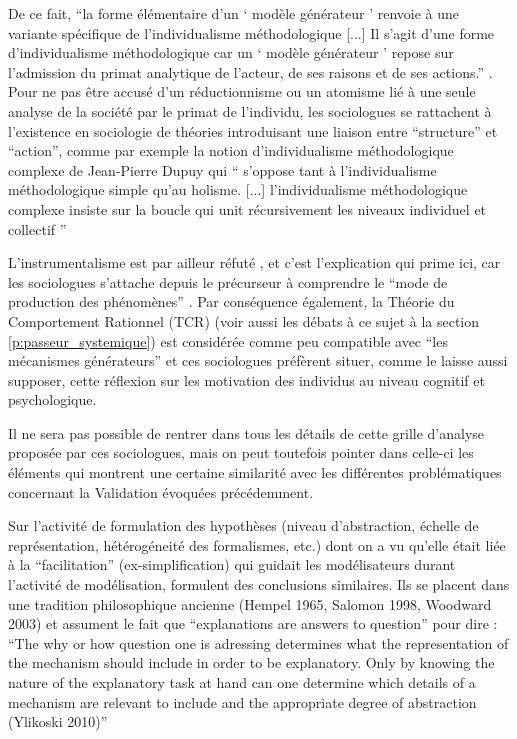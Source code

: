 De ce fait, \enquote{la forme élémentaire d’un \enquote{ modèle générateur } renvoie à une variante spécifique de l’individualisme méthodologique [...] Il s’agit d’une forme d’individualisme méthodologique car un  \enquote{ modèle générateur } repose sur l’admission du primat analytique de l’acteur, de ses raisons et de ses actions.} \autocite{Manzo2007}. Pour ne pas être accusé d'un réductionnisme ou un atomisme lié à une seule analyse de la société par le primat de l'individu, les sociologues se rattachent à l'existence en sociologie de théories introduisant une liaison entre \enquote{structure} et \enquote{action}, comme par exemple la notion d'individualisme méthodologique complexe de Jean-Pierre Dupuy \autocite{Dupuy2004} qui \enquote{ s’oppose tant à l’individualisme méthodologique simple qu’au holisme. [...] l’individualisme méthodologique complexe insiste sur la boucle qui unit récursivement les niveaux individuel et collectif } \autocite[9]{Manzo2007}

L'instrumentalisme est par ailleur réfuté  \autocite{Hedstrom2010}, et c'est l'explication qui prime ici, car les sociologues s'attache depuis le précurseur \textcite{Harre1972} à comprendre le \enquote{mode de production des phénomènes} . Par conséquence également, la Théorie du Comportement Rationnel (TCR) (voir aussi les débats à ce sujet à la section \ref{p:passeur_systemique}) est considérée comme peu compatible avec \enquote{les mécanismes générateurs} et ces sociologues préfèrent situer, comme \textcite{Conte2007} le laisse aussi supposer, cette réflexion sur les motivation des individus au niveau cognitif et psychologique. 

Il ne sera pas possible de rentrer dans tous les détails de cette grille d'analyse proposée par ces sociologues, mais on peut toutefois pointer dans celle-ci les éléments qui montrent une certaine similarité avec les différentes problématiques concernant la Validation évoquées précédemment.

Sur l'activité de formulation des hypothèses (niveau d'abstraction, échelle de représentation, hétérogéneité des formalismes, etc.) dont on a vu qu'elle était liée à la \enquote{facilitation} (ex-simplification) qui guidait les modélisateurs durant l'activité de modélisation, \textcite{Hedstrom2010} formulent des conclusions similaires. Ils se placent dans une tradition philosophique ancienne (Hempel 1965, Salomon 1998, Woodward 2003) et assument le fait que \foreignquote{english}{explanations are answers to question} pour dire : \foreignquote{english}{The why or how question one is adressing determines what the representation of the mechanism should include in order to be explanatory. Only by knowing the nature of the explanatory task at hand can one determine which details of a mechanism are relevant to include and the appropriate degree of abstraction (Ylikoski 2010)}

